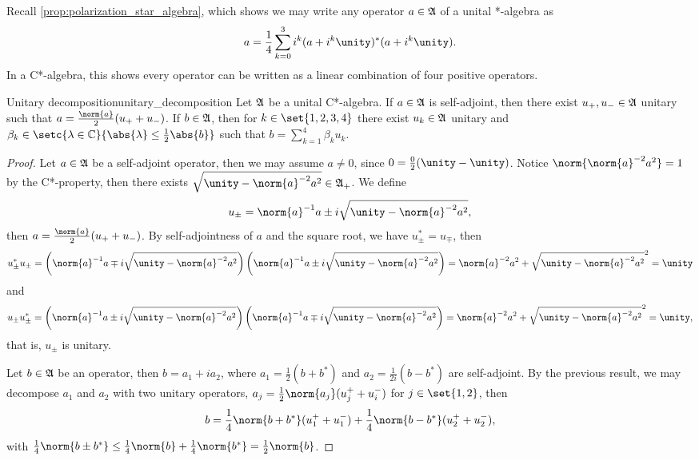 Recall \cref{prop:polarization_star_algebra}, which shows we may write any operator \(a \in \mathfrak{A}\) of a unital *-algebra as
\begin{equation*}
    a = \frac14 \sum_{k = 0}^3 i^k(a + i^k \unity)^*(a + i^k \unity).
\end{equation*}
In a C*-algebra, this shows every operator can be written as a linear combination of four positive operators.
\begin{proposition}{Unitary decomposition}{unitary_decomposition}
    Let \(\mathfrak{A}\) be a unital C*-algebra. If \(a \in \mathfrak{A}\) is self-adjoint, then there exist \(u_+, u_- \in \mathfrak{A}\) unitary such that \(a = \frac{\norm{a}}{2}(u_+ + u_-)\). If \(b \in \mathfrak{A}\), then for \(k \in \set{1,2,3,4}\) there exist \(u_k \in \mathfrak{A}\) unitary and \(\beta_k \in \setc{\lambda \in \mathbb{C}}{\abs{\lambda} \leq \frac12 \abs{b}}\) such that \(b = \sum_{k = 1}^4 \beta_k u_k\).
\end{proposition}
\begin{proof}
    Let \(a \in \mathfrak{A}\) be a self-adjoint operator, then we may assume \(a \neq 0\), since \(0 = \frac{0}{2}(\unity - \unity)\). Notice \(\norm{\norm{a}^{-2}a^2} = 1\) by the C*-property, then there exists \(\sqrt{\unity - \norm{a}^{-2}a^2} \in \algebra{A}_+\). We define
    \begin{equation*}
        u_\pm = \norm{a}^{-1} a \pm i \sqrt{\unity - \norm{a}^{-2} a^2},
    \end{equation*}
    then \(a = \frac{\norm{a}}{2}(u_+ + u_-)\). By self-adjointness of \(a\) and the square root, we have \(u_\pm^* = u_\mp\), then
    \begin{equation*}
        u_\pm^*u_\pm = \left(\norm{a}^{-1} a \mp i \sqrt{\unity - \norm{a}^{-2}a^2}\right)\left(\norm{a}^{-1} a \pm i \sqrt{\unity - \norm{a}^{-2}a^2}\right) = \norm{a}^{-2}a^2 + \sqrt{\unity - \norm{a}^{-2}a^2}^2 = \unity
    \end{equation*}
    and
    \begin{equation*}
        u_\pm u_\pm^* = \left(\norm{a}^{-1} a \pm i \sqrt{\unity - \norm{a}^{-2}a^2}\right)\left(\norm{a}^{-1} a \mp i \sqrt{\unity - \norm{a}^{-2}a^2}\right) = \norm{a}^{-2}a^2 + \sqrt{\unity - \norm{a}^{-2}a^2}^2 = \unity,
    \end{equation*}
    that is, \(u_\pm\) is unitary.

    Let \(b \in \mathfrak{A}\) be an operator, then \(b = a_1 + ia_2\), where \(a_1 = \frac{1}{2}(b + b^*)\) and \(a_2 = \frac{1}{2i}(b - b^*)\) are self-adjoint. By the previous result, we may decompose \(a_1\) and \(a_2\) with two unitary operators, \(a_j = \frac12\norm{a_j}(u_j^+ + u_i^-)\) for \(j \in \set{1,2}\), then
    \begin{equation*}
        b = \frac14\norm{b + b^*} (u_1^+ + u_1^-) + \frac14\norm{b - b^*} (u_2^+ + u_2^-),
    \end{equation*}
    with \(\frac14\norm{b \pm b^*} \leq \frac14\norm{b} + \frac14\norm{b^*} = \frac12 \norm{b}\).
\end{proof}

